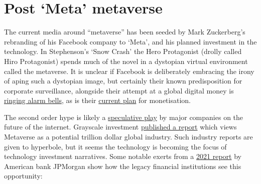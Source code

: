 \section{Post `Meta' metaverse}
The current media around ``metaverse'' has been seeded by Mark Zuckerberg's rebranding of his Facebook company to `Meta', and his planned investment in the technology. In Stephenson's `Snow Crash' the Hero Protagonist (drolly called Hiro Protagonist) spends much of the novel in a dystopian virtual environment called the metaverse. It is unclear if Facebook is deliberately embracing the irony of aping such a dystopian image, but certainly their known predisposition for corporate surveillance, alongside their attempt at a global digital money is \href{https://www.politico.com/newsletters/digital-future-daily/2022/04/12/the-facebook-whistleblower-takes-on-the-metaverse-00024762}{ringing alarm bells}, as is their \href{https://www.cnet.com/personal-finance/metas-new-47-5-fee-on-metaverse-items-has-nft-twitter-pissed/}{current plan} for monetisation.\par
The second order hype is likely a \href{https://www.goldmansachs.com/insights/pages/framing-the-future-of-web-3.0-metaverse-edition.html}{speculative play} by major companies on the future of the internet. Grayscale investment \href{https://grayscale.com/wp-content/uploads/2021/11/Grayscale_Metaverse_Report_Nov2021.pdf}{published a report} which views Metaverse as a potential trillion dollar global industry. Such industry reports are given to hyperbole, but it seems the technology is becoming the focus of technology investment narratives. Some notable exerts from a \href{https://www.jpmorgan.com/content/dam/jpm/treasury-services/documents/opportunities-in-the-metaverse.pdf}{2021 report} by American bank JPMorgan show how the legacy financial institutions see this opportunity:\par
